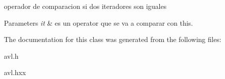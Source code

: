 operador de comparacion si dos iteradores son iguales 


\begin{DoxyParams}{Parameters}
{\em it} & es un operator que se va a comparar con this. \\
\hline
\end{DoxyParams}


The documentation for this class was generated from the following files\-:\begin{DoxyCompactItemize}
\item 
avl.\-h\item 
avl.\-hxx\end{DoxyCompactItemize}

